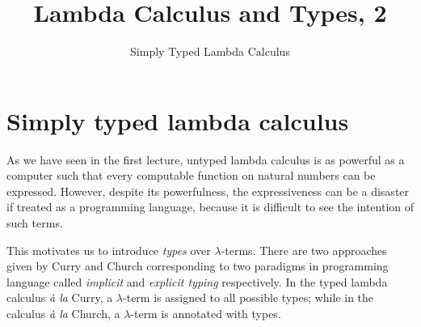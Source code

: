 \title{Lambda Calculus and Types, 2}
\subtitle{Simply Typed Lambda Calculus}

\begin{frame}
\maketitle
\end{frame}

\section{Simply typed lambda calculus}
As we have seen in the first lecture, untyped lambda calculus is as powerful as
a computer such that every computable function on natural numbers can be
expressed. However, despite its powerfulness, the expressiveness can be a
disaster if treated as a programming language, because it is difficult to see
the intention of such terms. 

This motivates us to introduce \emph{types} over $\lambda$-terms. There are two
approaches given by Curry and Church corresponding to two paradigms in
programming language called \emph{implicit} and \emph{explicit typing}
respectively.  In the typed lambda calculus \textit{\`a la} Curry, a
$\lambda$-term is assigned to all possible types; while in the calculus
\textit{\`a la} Church, a $\lambda$-term is annotated with types. 

